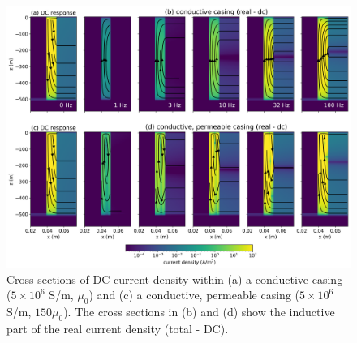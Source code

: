 \begin{figure}
    \begin{center}
    \includegraphics[width=1\textwidth]{figures/fdem-casing-currents-real.png}
    \end{center}
\caption{
    Cross sections of DC current density within (a) a conductive casing ($5\times10^6$ S/m, $\mu_0$) and (c) a conductive, permeable casing ($5\times10^6$ S/m, $150\mu_0$). The cross sections in (b) and (d) show the inductive part of the real current density (total - DC).
}
\label{fig:fdem-casing-currents-real}
\end{figure}



